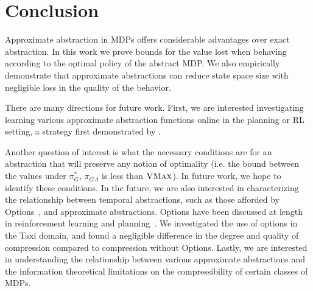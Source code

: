 \section{Conclusion}

Approximate abstraction in \acp{MDP} offers considerable advantages over exact abstraction. In this work we prove bounds for the value lost when behaving according to the optimal policy of the abstract \ac{MDP}. We also empirically demonstrate that approximate abstractions can reduce state space size with negligible loss in the quality of the behavior.


There are many directions for future work.
First, we are interested investigating learning various approximate abstraction functions online in the planning or \ac{RL} setting, a strategy first demonstrated by \citeauthor{ortner2013adaptive}.


Another question of interest is what the necessary conditions are for an abstraction that will preserve any notion of optimality (i.e. the bound between the values under $\pi_G^*$, $\pi_{GA}$ is less than $\textsc{VMax}$). In future work, we hope to identify these conditions.
In the future, we are also interested in characterizing the relationship between temporal abstractions, such as those afforded by Options~\cite{sutton1999between}, and approximate abstractions. Options have been discussed at length in reinforcement learning and planning~\cite{konidaris2007building,chentanez2004intrinsically}. We investigated the use of options in the Taxi domain, and found a negligible difference in the degree and quality of compression compared to compression without Options.
Lastly, we are interested in understanding the relationship between various approximate abstractions and the information theoretical limitations on the compressibility of certain classes of \acp{MDP}.